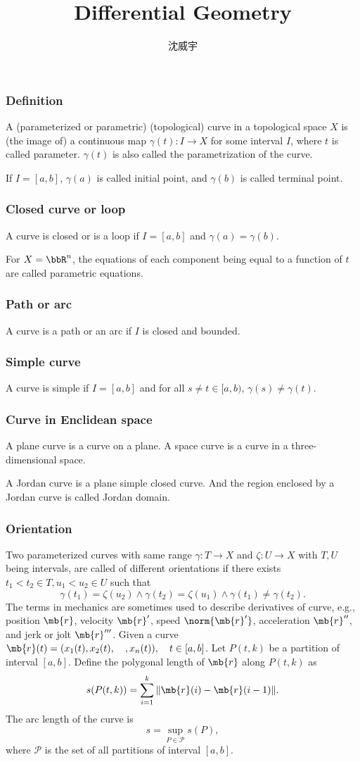 \documentclass[a4paper,12pt]{article}
\begin{document}
\title{Differential Geometry}
\author{沈威宇}
\date{\temtoday}
\titletocdoc
{}
\subsubsection{Definition}
A (parameterized or parametric) (topological) curve in a topological space $X$ is (the image of) a continuous map $\gamma(t)\colon I\to X$ for some interval $I$, where $t$ is called parameter. $\gamma(t)$ is also called the parametrization of the curve.

If $I=[a,b]$, $\gamma(a)$ is called initial point, and $\gamma(b)$ is called terminal point.
\subsubsection{Closed curve or loop}
A curve is closed or is a loop if $I=[a,b]$ and $\gamma(a)=\gamma(b)$.

For $X=\bbR^n$, the equations of each component being equal to a function of $t$ are called parametric equations.
\subsubsection{Path or arc}
A curve is a path or an arc if $I$ is closed and bounded.
\subsubsection{Simple curve}
A curve is simple if $I=[a,b]$ and for all $s\neq t\in[a,b)$, $\gamma(s)\neq\gamma(t)$.
\subsubsection{Curve in Enclidean space}
A plane curve is a curve on a plane. A space curve is a curve in a three-dimensional space.

A Jordan curve is a plane simple closed curve. And the region enclosed by a Jordan curve is called Jordan domain.
\subsubsection{Orientation}
Two parameterized curves with same range $\gamma\colon T\to X$ and $\zeta\colon U\to X$ with $T,U$ being intervals, are called of different orientations if there exists $t_1<t_2\in T,u_1<u_2\in U$ such that
\[\gamma(t_1)=\zeta(u_2)\land\gamma(t_2)=\zeta(u_1)\land\gamma(t_1)\neq\gamma(t_2).\]
The terms in mechanics are sometimes used to describe derivatives of curve, e.g., position $\mb{r}$, velocity $\mb{r}'$, speed $\norm{\mb{r}'}$, acceleration $\mb{r}''$, and jerk or jolt $\mb{r}'''$.
Given a curve $\mb{r}(t)=(x_1(t),x_2(t),\quad,x_n(t)),\quad t\in[a,b]$. Let $P(t,k)$ be a partition of interval $[a,b]$. Define the polygonal length of $\mb{r}$ along $P(t,k)$ as
\[s(P(t,k))=\sum_{i=1}^k\|\mb{r}(i)-\mb{r}(i-1)\|.\]
The arc length of the curve is
\[s=\sup_{P\in\mathcal{P}}s(P),\]
where $\mathcal{P}$ is the set of all partitions of interval $[a,b]$.
\end{document}
